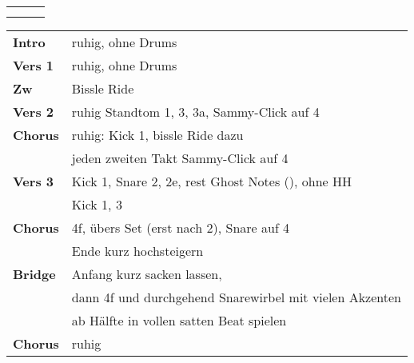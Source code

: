 

\begin{tabular}{p{0.6cm}p{12cm}p{1.4cm}}
	\rowcolor{cyan} \myRow{\thesongnumber} & \myRow{Gotteslamm} & \myRow{70} \\
	                                       &                    &            \\
\end{tabular}

\begin{tabular}{p{1.6cm}l}
	\textbf{Intro}  & ruhig, ohne Drums                                             \\
	\textbf{Vers 1} & ruhig, ohne Drums                                             \\
	\textbf{Zw}     & Bissle Ride                                                   \\
	\textbf{Vers 2} & ruhig Standtom 1, 3, 3a, Sammy-Click auf 4                    \\
	\textbf{Chorus} & ruhig: Kick 1, bissle Ride dazu                               \\
	                & jeden zweiten Takt Sammy-Click auf 4                          \\
	\textbf{Vers 3} & Kick 1, Snare 2, 2e, rest Ghost Notes (\sechzehntel), ohne HH \\
	                & Kick 1, 3                                                     \\
	\textbf{Chorus} & 4f, übers Set (erst nach 2), Snare auf 4                      \\
	                & Ende kurz \achtel hochsteigern                                \\
	\textbf{Bridge} & Anfang kurz sacken lassen,                                    \\ %
	                & dann 4f und durchgehend Snarewirbel mit vielen Akzenten       \\ %
	                & ab Hälfte in vollen satten Beat spielen                       \\ %
	\textbf{Chorus} & ruhig                                                         \\ %

\end{tabular}
